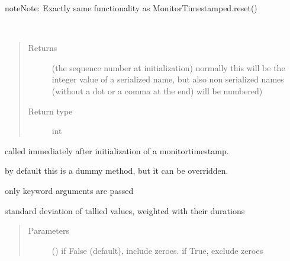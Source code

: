 \documentclass[letterpaper,10pt,english]{sphinxmanual}
\begin{document}
\begin{fulllineitems}
\begin{fulllineitems}
\begin{quote}
\begin{description}
\end{description}\end{quote}

\begin{sphinxadmonition}{note}{Note:}
Exactly same functionality as MonitorTimestamped.reset()
\end{sphinxadmonition}

\end{fulllineitems}


\begin{fulllineitems}
\label{\detokenize{Reference:salabim.MonitorTimestamp.sequence_number}}~\begin{quote}\begin{description}
\item[{Returns}] \leavevmode
{} \textendash{} (the sequence number at initialization) 
normally this will be the integer value of a serialized name,
but also non serialized names (without a dot or a comma at the end)
will be numbered)

\item[{Return type}] \leavevmode
int

\end{description}\end{quote}

\end{fulllineitems}


\begin{fulllineitems}
\label{\detokenize{Reference:salabim.MonitorTimestamp.setup}}
called immediately after initialization of a monitortimestamp.

by default this is a dummy method, but it can be overridden.

only keyword arguments are passed

\end{fulllineitems}


\begin{fulllineitems}
\label{\detokenize{Reference:salabim.MonitorTimestamp.std}}
standard deviation of tallied values, weighted with their durations
\begin{quote}\begin{description}
\item[{Parameters}] \leavevmode
{} () \textendash{} if False (default), include zeroes. if True, exclude zeroes


\end{description}
\end{quote}
\end{fulllineitems}
\end{fulllineitems}
\end{document}
